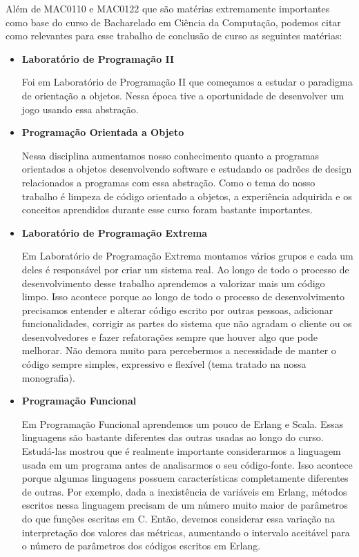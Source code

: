 \documentclass[a4paper, 11pt]{article}
\begin{document}
Além de MAC0110 e MAC0122 que são matérias extremamente importantes como base do curso de Bacharelado em Ciência da Computação, podemos citar como relevantes para esse trabalho de conclusão de curso as seguintes matérias:

\begin{itemize}
\item
\textbf{Laboratório de Programação II}
     
Foi em Laboratório de Programação II que começamos a estudar o paradigma de orientação a objetos. Nessa época tive a oportunidade de desenvolver um jogo usando essa abstração.

\item
\textbf{Programação Orientada a Objeto}

Nessa disciplina aumentamos nosso conhecimento quanto a programas orientados a objetos desenvolvendo software e estudando os padrões de design relacionados a programas com essa abstração. Como o tema do nosso trabalho é limpeza de código orientado a objetos, a experiência adquirida e os conceitos aprendidos durante esse curso foram bastante importantes.
   
\item
\textbf{Laboratório de Programação Extrema}

Em Laboratório de Programação Extrema montamos vários grupos e cada um deles é responsável por criar um sistema real. Ao longo de todo o processo de desenvolvimento desse trabalho aprendemos a valorizar mais um código limpo. Isso acontece porque ao longo de todo o processo de desenvolvimento precisamos entender e alterar código escrito por outras pessoas, adicionar funcionalidades, corrigir as partes do sistema que não agradam o cliente ou os desenvolvedores e fazer refatorações sempre que houver algo que pode melhorar. Não demora muito para percebermos a necessidade de manter o código sempre simples, expressivo e flexível (tema tratado na nossa monografia).

\item
\textbf{Programação Funcional}
                               
Em Programação Funcional aprendemos um pouco de Erlang e Scala. Essas linguagens são bastante diferentes das outras usadas ao longo do curso. Estudá-las mostrou que é realmente importante considerarmos a linguagem usada em um programa antes de analisarmos o seu código-fonte. Isso acontece porque algumas linguagens possuem características completamente diferentes de outras. Por exemplo, dada a inexistência de variáveis em Erlang, métodos escritos nessa linguagem precisam de um número muito maior de parâmetros do que funções escritas em C. Então, devemos considerar essa variação na interpretação dos valores das métricas, aumentando o intervalo aceitável para o número de parâmetros dos códigos escritos em Erlang.
	
\end{itemize}
	 
\end{document}
